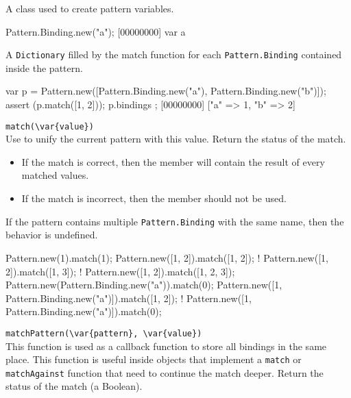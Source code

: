 \begin{urbiscriptapi}

\item[Binding]
  A class used to create pattern variables.

\begin{urbiscript}
Pattern.Binding.new("a");
[00000000] var a
\end{urbiscript}

\item[bindings]

  A \lstinline|Dictionary| filled by the match function for each
  \lstinline|Pattern.Binding| contained inside the pattern.

\begin{urbiscript}
{
  var p = Pattern.new([Pattern.Binding.new("a"), Pattern.Binding.new("b")]);
  assert (p.match([1, 2]));
  p.bindings
};
[00000000] ["a" => 1, "b" => 2]
\end{urbiscript}


\item \lstinline|match(\var{value})|\\

  Use  to unify the current pattern with this value.
  Return the status of the match.
  \begin{itemize}
    \item If the match is correct, then the  member will
      contain the result of every matched values.
    \item If the match is incorrect, then the  member should
      not be used.
  \end{itemize}
  If the pattern contains multiple \lstinline|Pattern.Binding| with
  the same name, then the behavior is undefined.

\begin{urbiassert}
Pattern.new(1).match(1);
Pattern.new([1, 2]).match([1, 2]);
! Pattern.new([1, 2]).match([1, 3]);
! Pattern.new([1, 2]).match([1, 2, 3]);
Pattern.new(Pattern.Binding.new("a")).match(0);
Pattern.new([1, Pattern.Binding.new("a")]).match([1, 2]);
! Pattern.new([1, Pattern.Binding.new("a")]).match(0);
\end{urbiassert}


\item \lstinline|matchPattern(\var{pattern}, \var{value})|\\

  This function is used as a callback function to store all bindings
  in the same place.  This function is useful inside objects that
  implement a \lstinline|match| or \lstinline|matchAgainst| function
  that need to continue the match deeper.  Return the status of the
  match (a Boolean).


\end{urbiscriptapi}
